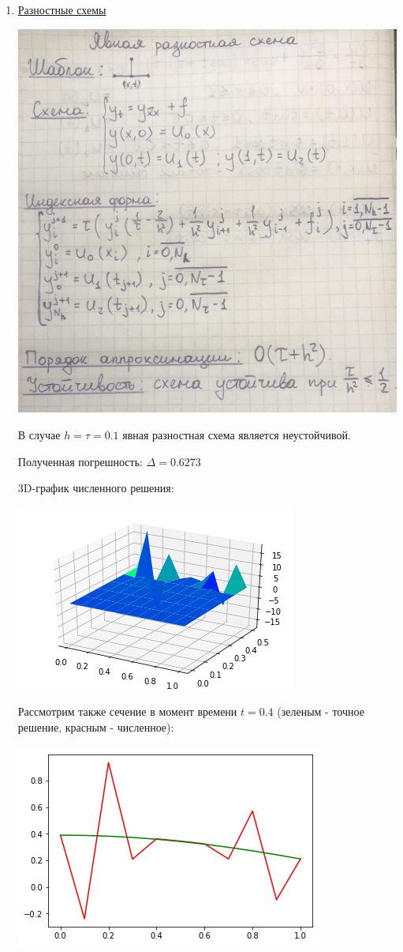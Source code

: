 \documentclass{article}%
\begin{document}
\begin{enumerate}
\item%
\underline{Разностные схемы}

\includegraphics[scale=0.1]{img01.JPG}

В случае $h=\tau=0.1$ явная разностная схема является неустойчивой.

Полученная погрешность: $\Delta = 0.6273$

3D-график численного решения:

\includegraphics[scale=0.7]{output_12_0.png}

Рассмотрим также сечение в момент времени $t=0.4$ (зеленым - точное решение, красным - численное):

\includegraphics[scale=0.7]{output_13_1.png}


\end{enumerate}
\end{document}
